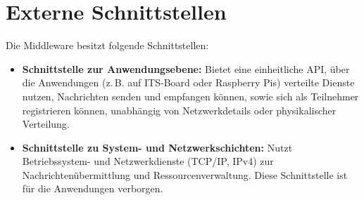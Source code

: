 \section{Externe Schnittstellen}

Die Middleware besitzt folgende Schnittstellen:

\begin{itemize}
	\item \textbf{Schnittstelle zur Anwendungsebene:}  
	Bietet eine einheitliche API, über die Anwendungen (z.\,B. auf ITS-Board oder Raspberry Pis) verteilte Dienste nutzen, Nachrichten senden und empfangen können, sowie sich als Teilnehmer registrieren können, unabhängig von Netzwerkdetails oder physikalischer Verteilung.
	
	\item \textbf{Schnittstelle zu System- und Netzwerkschichten:}  
	Nutzt Betriebssystem- und Netzwerkdienste (TCP/IP, IPv4) zur Nachrichtenübermittlung und Ressourcenverwaltung. Diese Schnittstelle ist für die Anwendungen verborgen.
\end{itemize}